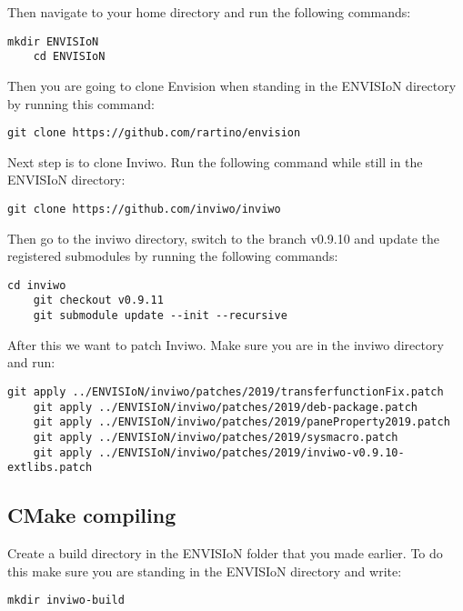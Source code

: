 Then navigate to your home directory and run the following commands:

\begin{lstlisting}[frame = single, breaklines=true]
    mkdir ENVISIoN
    cd ENVISIoN
\end{lstlisting}

Then you are going to clone Envision when standing in the ENVISIoN directory by running this command:

\begin{lstlisting}[frame = single, breaklines=true]
    git clone https://github.com/rartino/envision
\end{lstlisting}

Next step is to clone Inviwo. Run the following command while still in the ENVISIoN directory:
\begin{lstlisting}[frame = single, breaklines=true]
    git clone https://github.com/inviwo/inviwo
\end{lstlisting}

Then go to the inviwo directory, switch to the branch v0.9.10 and update the registered submodules by running the following commands:

\begin{lstlisting}[frame = single, breaklines=true]
    cd inviwo
    git checkout v0.9.11
    git submodule update --init --recursive
\end{lstlisting}

After this we want to patch Inviwo. Make sure you are in the inviwo directory and run:
\begin{lstlisting}[frame = single, breaklines=true]
    git apply ../ENVISIoN/inviwo/patches/2019/transferfunctionFix.patch
    git apply ../ENVISIoN/inviwo/patches/2019/deb-package.patch
    git apply ../ENVISIoN/inviwo/patches/2019/paneProperty2019.patch
    git apply ../ENVISIoN/inviwo/patches/2019/sysmacro.patch
    git apply ../ENVISIoN/inviwo/patches/2019/inviwo-v0.9.10-extlibs.patch
\end{lstlisting}

\subsection{CMake compiling}
Create a build directory in the ENVISIoN folder that you made earlier. To do this make sure you are standing in the ENVISIoN directory and write:

\begin{lstlisting}[frame = single, breaklines=true]
    mkdir inviwo-build
\end{lstlisting}

